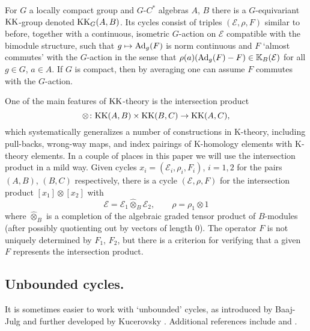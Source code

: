 \documentclass[11pt,reqno]{amsart}
\theoremstyle{definition}
\theoremstyle{remark}
\newcommand{\wh}[1]{\widehat{#1}}
\def\Ad{\ensuremath{\textnormal{Ad}}}
\def\E{\ensuremath{\mathcal{E}}}
\def\bK{\ensuremath{\mathbb{K}}}
\def\KK{\ensuremath{\textnormal{KK}}}
\begin{document}
For $G$ a locally compact group and $G$-$C^\ast$ algebras $A$, $B$ there is a $G$-equivariant $\KK$-group denoted $\KK_G(A,B)$.  Its cycles consist of triples $(\E,\rho,F)$ similar to before, together with a continuous, isometric $G$-action on $\E$ compatible with the bimodule structure, such that $g \mapsto \Ad_g(F)$ is norm continuous and $F$ `almost commutes' with the $G$-action in the sense that $\rho(a)(\Ad_g(F)-F) \in \bK_B(\E)$ for all $g \in G$, $a \in A$.  If $G$ is compact, then by averaging one can assume $F$ commutes with the $G$-action.

One of the main features of $\KK$-theory is the intersection product
\[ \otimes \colon \KK(A,B) \times \KK(B,C) \rightarrow \KK(A,C), \]
which systematically generalizes a number of constructions in K-theory, including pull-backs, wrong-way maps, and index pairings of K-homology elements with K-theory elements.  In a couple of places in this paper we will use the intersection product in a mild way.  Given cycles $x_i=(\E_i,\rho_i,F_i)$, $i=1,2$ for the pairs $(A,B)$, $(B,C)$ respectively, there is a cycle $(\E,\rho,F)$ for the intersection product $[x_1]\otimes [x_2]$ with
\[ \E=\E_1 \wh{\otimes}_{\scriptscriptstyle B} \E_2, \qquad \rho=\rho_1\otimes 1 \]
where $\wh{\otimes}_B$ is a completion of the algebraic graded tensor product of $B$-modules (after possibly quotienting out by vectors of length $0$).  The operator $F$ is not uniquely determined by $F_1$, $F_2$, but there is a criterion for verifying that a given $F$ represents the intersection product.

\subsection{Unbounded cycles.}
It is sometimes easier to work with `unbounded' cycles, as introduced by Baaj-Julg \cite{BaajJulg} and further developed by Kucerovsky \cite{KucerovskyUnbounded}.  Additional references include \cite{Blackadar} and \cite[Appendix]{MislinValette}.
\end{document}
